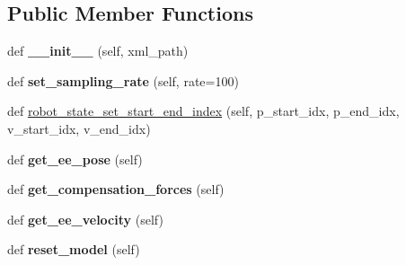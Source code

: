\subsection*{Public Member Functions}
\begin{DoxyCompactItemize}
\item 
\hypertarget{classaml__robot_1_1mujoco_1_1mujoco__robot_1_1_mujoco_robot_a0c93caf9f5746868f6e847c726dcc6c3}{}\label{classaml__robot_1_1mujoco_1_1mujoco__robot_1_1_mujoco_robot_a0c93caf9f5746868f6e847c726dcc6c3} 
def {\bfseries \+\_\+\+\_\+init\+\_\+\+\_\+} (self, xml\+\_\+path)
\item 
\hypertarget{classaml__robot_1_1mujoco_1_1mujoco__robot_1_1_mujoco_robot_a0f18fbfdde2a14ca8a9721c5f3af7501}{}\label{classaml__robot_1_1mujoco_1_1mujoco__robot_1_1_mujoco_robot_a0f18fbfdde2a14ca8a9721c5f3af7501} 
def {\bfseries set\+\_\+sampling\+\_\+rate} (self, rate=100)
\item 
def \hyperlink{classaml__robot_1_1mujoco_1_1mujoco__robot_1_1_mujoco_robot_a36c6f2efeec6ef3e551ae098780c59bd}{robot\+\_\+state\+\_\+set\+\_\+start\+\_\+end\+\_\+index} (self, p\+\_\+start\+\_\+idx, p\+\_\+end\+\_\+idx, v\+\_\+start\+\_\+idx, v\+\_\+end\+\_\+idx)
\item 
\hypertarget{classaml__robot_1_1mujoco_1_1mujoco__robot_1_1_mujoco_robot_a07867eb5e34c86e6b0c9933f7314f272}{}\label{classaml__robot_1_1mujoco_1_1mujoco__robot_1_1_mujoco_robot_a07867eb5e34c86e6b0c9933f7314f272} 
def {\bfseries get\+\_\+ee\+\_\+pose} (self)
\item 
\hypertarget{classaml__robot_1_1mujoco_1_1mujoco__robot_1_1_mujoco_robot_a0825bf67fc771ed5542fc6c901a5b4b8}{}\label{classaml__robot_1_1mujoco_1_1mujoco__robot_1_1_mujoco_robot_a0825bf67fc771ed5542fc6c901a5b4b8} 
def {\bfseries get\+\_\+compensation\+\_\+forces} (self)
\item 
\hypertarget{classaml__robot_1_1mujoco_1_1mujoco__robot_1_1_mujoco_robot_a61055aa4cd93fe16ed9af7c2658db2b3}{}\label{classaml__robot_1_1mujoco_1_1mujoco__robot_1_1_mujoco_robot_a61055aa4cd93fe16ed9af7c2658db2b3} 
def {\bfseries get\+\_\+ee\+\_\+velocity} (self)
\item 
\hypertarget{classaml__robot_1_1mujoco_1_1mujoco__robot_1_1_mujoco_robot_aa1a12e82381e4ab718cd5e8d7093e866}{}\label{classaml__robot_1_1mujoco_1_1mujoco__robot_1_1_mujoco_robot_aa1a12e82381e4ab718cd5e8d7093e866} 
def {\bfseries reset\+\_\+model} (self)
\item 
\hypertarget{classaml__robot_1_1mujoco_1_1mujoco__robot_1_1_mujoco_robot_a2f61333a1fd8178f853066885b41ff7e}{}\label{classaml__robot_1_1mujoco_1_1mujoco__robot_1_1_mujoco_robot_a2f61333a1fd8178f853066885b41ff7e} 

\end{DoxyCompactItemize}
